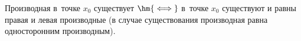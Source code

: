 
    Производная в~точке $x_0$ существует $\hm{\iff}$ в~точке $x_0$ существуют и равны правая и левая производные (в случае существования производная равна односторонним производным).
